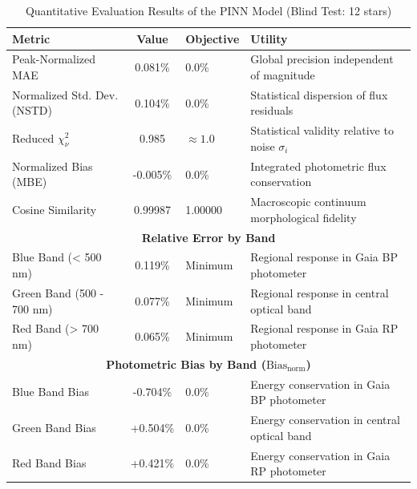 
\begin{table}[htpb]
\centering
\caption{Quantitative Evaluation Results of the PINN Model (Blind Test: 12 stars)}
\label{tab:pinn_evaluation}
\begin{tabular}{lcll}
\hline
\textbf{Metric} & \textbf{Value} & \textbf{Objective} & \textbf{Utility} \\
\hline
Peak-Normalized MAE & 0.081\% & 0.0\% & Global precision independent of magnitude \\
Normalized Std. Dev. (NSTD) & 0.104\% & 0.0\% & Statistical dispersion of flux residuals \\
Reduced $\chi^2_\nu$ & 0.985 & $\approx 1.0$ & Statistical validity relative to noise $\sigma_i$ \\
Normalized Bias (MBE) & -0.005\% & 0.0\% & Integrated photometric flux conservation \\
Cosine Similarity & 0.99987 & 1.00000 & Macroscopic continuum morphological fidelity \\
\hline
\multicolumn{4}{c}{\textbf{Relative Error by Band}} \\
\hline
Blue Band (< 500 nm) & 0.119\% & Minimum & Regional response in Gaia BP photometer \\
Green Band (500 - 700 nm) & 0.077\% & Minimum & Regional response in central optical band \\
Red Band (> 700 nm) & 0.065\% & Minimum & Regional response in Gaia RP photometer \\
\hline
\multicolumn{4}{c}{\textbf{Photometric Bias by Band ($\text{Bias}_{\text{norm}}$)}} \\
\hline
Blue Band Bias & -0.704\% & 0.0\% & Energy conservation in Gaia BP photometer \\
Green Band Bias & +0.504\% & 0.0\% & Energy conservation in central optical band \\
Red Band Bias & +0.421\% & 0.0\% & Energy conservation in Gaia RP photometer \\
\hline
\end{tabular}
\end{table}
